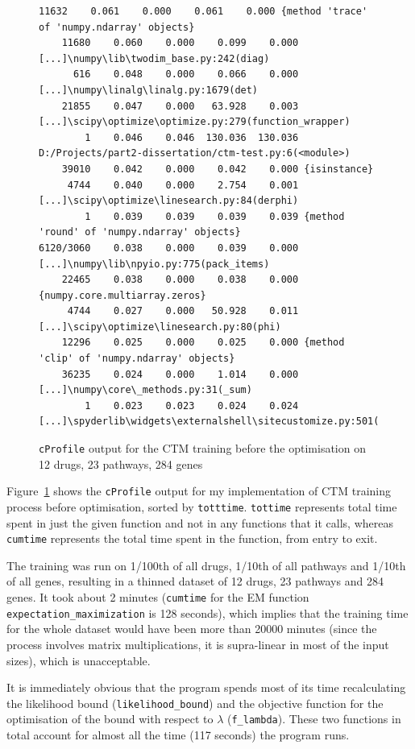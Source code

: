 \documentclass[12pt,a4paper,twoside,openright]{report}
\begin{document}
\begin{figure}
\begin{Verbatim}[fontsize=\scriptsize]
    11632    0.061    0.000    0.061    0.000 {method 'trace' of 'numpy.ndarray' objects}
    11680    0.060    0.000    0.099    0.000 [...]\numpy\lib\twodim_base.py:242(diag)
      616    0.048    0.000    0.066    0.000 [...]\numpy\linalg\linalg.py:1679(det)
    21855    0.047    0.000   63.928    0.003 [...]\scipy\optimize\optimize.py:279(function_wrapper)
        1    0.046    0.046  130.036  130.036 D:/Projects/part2-dissertation/ctm-test.py:6(<module>)
    39010    0.042    0.000    0.042    0.000 {isinstance}
     4744    0.040    0.000    2.754    0.001 [...]\scipy\optimize\linesearch.py:84(derphi)
        1    0.039    0.039    0.039    0.039 {method 'round' of 'numpy.ndarray' objects}
6120/3060    0.038    0.000    0.039    0.000 [...]\numpy\lib\npyio.py:775(pack_items)
    22465    0.038    0.000    0.038    0.000 {numpy.core.multiarray.zeros}
     4744    0.027    0.000   50.928    0.011 [...]\scipy\optimize\linesearch.py:80(phi)
    12296    0.025    0.000    0.025    0.000 {method 'clip' of 'numpy.ndarray' objects}
    36235    0.024    0.000    1.014    0.000 [...]\numpy\core\_methods.py:31(_sum)
        1    0.023    0.023    0.024    0.024 [...]\spyderlib\widgets\externalshell\sitecustomize.py:501(run)
\end{Verbatim}
\caption{\texttt{cProfile} output for the CTM training before the optimisation on 12 drugs, 23 pathways, 284 genes}
\label{fig:ctm-profile-before}
\end{figure}

Figure~\ref{fig:ctm-profile-before} shows the \texttt{cProfile} output for my implementation of CTM training process before optimisation, sorted by \texttt{totttime}. \texttt{tottime} represents total time spent in just the given function and not in any functions that it calls, whereas \texttt{cumtime} represents the total time spent in the function, from entry to exit.

The training was run on 1/100th of all drugs, 1/10th of all pathways and 1/10th of all genes, resulting in a thinned dataset of 12 drugs, 23 pathways and 284 genes. It took about 2 minutes (\texttt{cumtime} for the EM function \texttt{expectation\_maximization} is 128 seconds), which implies that the training time for the whole dataset would have been more than 20000 minutes (since the process involves matrix multiplications, it is supra-linear in most of the input sizes), which is unacceptable.

It is immediately obvious that the program spends most of its time recalculating the likelihood bound (\texttt{likelihood\_bound}) and the objective function for the optimisation of the bound with respect to $\lambda$ (\texttt{f\_lambda}). These two functions in total account for almost all the time (117 seconds) the program runs.
\end{document}
